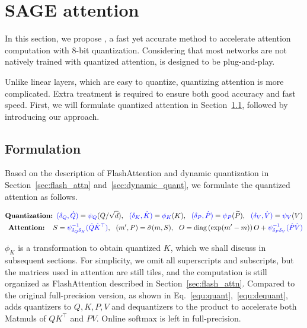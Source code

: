 

\section{SAGE attention}



In this section, we propose \our, a fast yet accurate method to accelerate attention computation with 8-bit quantization. Considering that most networks are not natively trained with quantized attention, \our is designed to be plug-and-play. 

Unlike linear layers, which are easy to quantize, quantizing attention is more complicated. Extra treatment is required to ensure both good accuracy and fast speed. 
First, we will formulate quantized attention in Section~\ref{sec:formula}, followed by introducing our approach.

\subsection{Formulation} \label{sec:formula}
Based on the description of FlashAttention and dynamic quantization in Section~\ref{sec:flash_attn} and~\ref{sec:dynamic_quant}, we formulate the quantized attention as follows.


{
\small
\begin{align}
\label{equ:quant}
\textbf{Quantization: } \textcolor{blue}{{(\delta_Q, \hat Q)}} = \textcolor{blue}{{\psi_Q}}(Q/\sqrt{d}),~~\textcolor{blue}{{(\delta_K, \hat K)}} = \textcolor{blue}{{\phi_K}}(K),~~\textcolor{blue}{{(\delta_P, \hat P)}} = \textcolor{blue}{{\psi_P}}(\widetilde P),~~\textcolor{blue}{{(\delta_V, \hat V)}} = \textcolor{blue}{{\psi_V}}(V)\\
\label{equ:dequant}
\textbf{Attention: } ~~S = \textcolor{blue}{{\psi^{-1}_{\delta_Q\delta_K}(\hat Q \hat K^\top)}},~~(m^\prime, P) = \tilde\sigma(m, S),
~~O=\mathrm{diag}\left(\exp(m^\prime-m)\right) O + \textcolor{blue}{{\psi^{-1}_{\delta_P\delta_V}(\hat P \hat V)}}
\end{align}
}


$\phi_K$ is a transformation to obtain quantized $K$, which we shall discuss in subsequent sections. 
For simplicity, we omit all superscripts and subscripts, but the matrices used in attention are still tiles, and the computation is still organized as FlashAttention described in Section~\ref{sec:flash_attn}. Compared to the original full-precision version, as shown in Eq.~\ref{equ:quant},~\ref{equ:dequant}, \our adds quantizers to $Q,K,P,V$ and dequantizers to the product to accelerate both Matmuls of $QK^\top$ and $PV$. Online softmax is left in full-precision.


